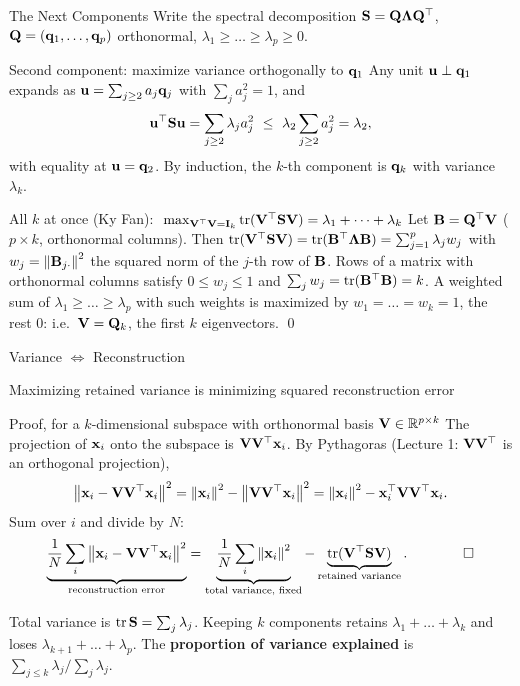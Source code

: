 \documentclass[11pt,aspectratio=169]{beamer}
\begin{document}
\begin{frame}{The Next Components}\small
Write the spectral decomposition $\mathbf{S}=\mathbf{Q}\boldsymbol{\Lambda}\mathbf{Q}^{\top}$, $\mathbf{Q}=(\mathbf{q}_1,\dots,\mathbf{q}_p)$ orthonormal,
$\lambda_1\ge\dots\ge\lambda_p\ge0$.
\begin{derivation}{Second component: maximize variance orthogonally to $\mathbf{q}_1$}
Any unit $\mathbf{u}\perp\mathbf{q}_1$ expands as $\mathbf{u}=\sum_{j\ge2}a_j\mathbf{q}_j$ with $\sum_ja_j^2=1$, and
\[
\vu\T\vS\vu=\sum_{j\ge2}\lambda_ja_j^2\ \le\ \lambda_2\sum_{j\ge2}a_j^2=\lambda_2,
\]
with equality at $\mathbf{u}=\mathbf{q}_2$. By induction, the $k$-th component is $\mathbf{q}_k$ with variance $\lambda_k$.
\end{derivation}
\begin{derivation}{All $k$ at once (Ky Fan): $\ \max_{\vV\T\vV=\vI_k}\tr(\vV\T\vS\vV)=\lambda_1+\dots+\lambda_k$}
Let $\mathbf{B}=\mathbf{Q}^{\top}\mathbf{V}$ ($p\times k$, orthonormal columns). Then $\operatorname{tr}(\mathbf{V}^{\top}\mathbf{S}\mathbf{V})=\operatorname{tr}(\mathbf{B}^{\top}\boldsymbol{\Lambda}\mathbf{B})=\sum_{j=1}^p\lambda_jw_j$
with $w_j=\left\lVert \mathbf{B}_{j\cdot} \right\rVert^2$ the squared norm of the $j$-th row of $\mathbf{B}$. Rows of a matrix with orthonormal columns
satisfy $0\le w_j\le1$ and $\sum_jw_j=\operatorname{tr}(\mathbf{B}^{\top}\mathbf{B})=k$. A weighted sum of $\lambda_1\ge\dots\ge\lambda_p$ with such weights
is maximized by $w_1=\dots=w_k=1$, the rest $0$: i.e.\ $\mathbf{V}=\mathbf{Q}_k$, the first $k$ eigenvectors. \qed
\end{derivation}
\end{frame}

\begin{frame}{Variance $\Leftrightarrow$ Reconstruction}\footnotesize
\begin{claim}{Maximizing retained variance is minimizing squared reconstruction error}
\end{claim}
\begin{derivation}{Proof, for a $k$-dimensional subspace with orthonormal basis $\mathbf{V}\in\mathbb{R}^{p\times k}$}
The projection of $\mathbf{x}_i$ onto the subspace is $\mathbf{V}\mathbf{V}^{\top}\mathbf{x}_i$. By Pythagoras (Lecture 1: $\mathbf{V}\mathbf{V}^{\top}$ is an orthogonal projection),
\[
\left\lVert \mathbf{x}_i-\mathbf{V}\mathbf{V}^{\top}\mathbf{x}_i \right\rVert^2=\left\lVert \mathbf{x}_i \right\rVert^2-\left\lVert \mathbf{V}\mathbf{V}^{\top}\mathbf{x}_i \right\rVert^2=\left\lVert \mathbf{x}_i \right\rVert^2-\mathbf{x}_i^{\top}\mathbf{V}\mathbf{V}^{\top}\mathbf{x}_i .
\]
Sum over $i$ and divide by $N$:
\[
\underbrace{\frac1N\sum_i\left\lVert \mathbf{x}_i-\mathbf{V}\mathbf{V}^{\top}\mathbf{x}_i \right\rVert^2}_{\text{reconstruction error}}
=\underbrace{\frac1N\sum_i\left\lVert \mathbf{x}_i \right\rVert^2}_{\text{total variance, fixed}}
-\underbrace{\operatorname{tr}(\mathbf{V}^{\top}\mathbf{S}\mathbf{V})}_{\text{retained variance}} .\qquad\qed
\]
\end{derivation}
Total variance is $\operatorname{tr}\mathbf{S}=\sum_j\lambda_j$. Keeping $k$ components retains $\lambda_1+\dots+\lambda_k$ and loses
$\lambda_{k+1}+\dots+\lambda_p$. The \textbf{proportion of variance explained} is $\sum_{j\le k}\lambda_j\big/\sum_j\lambda_j$.
\end{frame}
\end{document}
